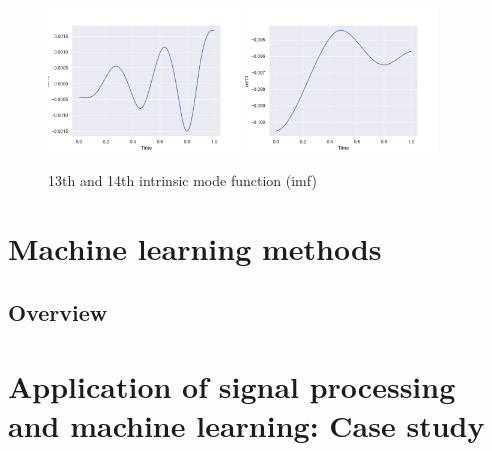 \documentclass[11pt, oneside]{article}   	%
\begin{document}
\begin{flushleft}
\begin{figure}[H] %
   \centering
   \includegraphics[width=2in]{imf/imf13.png} 
     \includegraphics[width=2in]{imf/imf14.png} 
   \caption{13th and 14th intrinsic mode function (imf)}
   \label{fig:imf1314}
\end{figure}

\end{flushleft}


\section{Machine learning methods}
\subsection{Overview}




\section{Application of signal processing and machine learning: Case study}
\end{document}
